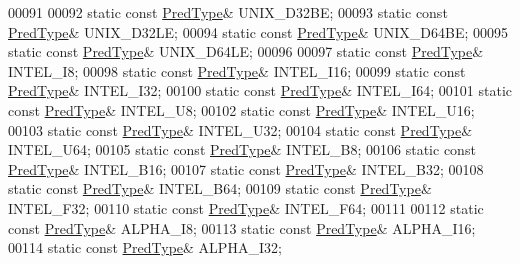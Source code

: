 \begin{DoxyCode}
00091 
00092         \textcolor{keyword}{static} \textcolor{keyword}{const} \hyperlink{class_h5_1_1_pred_type}{PredType}& UNIX\_D32BE;
00093         \textcolor{keyword}{static} \textcolor{keyword}{const} \hyperlink{class_h5_1_1_pred_type}{PredType}& UNIX\_D32LE;
00094         \textcolor{keyword}{static} \textcolor{keyword}{const} \hyperlink{class_h5_1_1_pred_type}{PredType}& UNIX\_D64BE;
00095         \textcolor{keyword}{static} \textcolor{keyword}{const} \hyperlink{class_h5_1_1_pred_type}{PredType}& UNIX\_D64LE;
00096 
00097         \textcolor{keyword}{static} \textcolor{keyword}{const} \hyperlink{class_h5_1_1_pred_type}{PredType}& INTEL\_I8;
00098         \textcolor{keyword}{static} \textcolor{keyword}{const} \hyperlink{class_h5_1_1_pred_type}{PredType}& INTEL\_I16;
00099         \textcolor{keyword}{static} \textcolor{keyword}{const} \hyperlink{class_h5_1_1_pred_type}{PredType}& INTEL\_I32;
00100         \textcolor{keyword}{static} \textcolor{keyword}{const} \hyperlink{class_h5_1_1_pred_type}{PredType}& INTEL\_I64;
00101         \textcolor{keyword}{static} \textcolor{keyword}{const} \hyperlink{class_h5_1_1_pred_type}{PredType}& INTEL\_U8;
00102         \textcolor{keyword}{static} \textcolor{keyword}{const} \hyperlink{class_h5_1_1_pred_type}{PredType}& INTEL\_U16;
00103         \textcolor{keyword}{static} \textcolor{keyword}{const} \hyperlink{class_h5_1_1_pred_type}{PredType}& INTEL\_U32;
00104         \textcolor{keyword}{static} \textcolor{keyword}{const} \hyperlink{class_h5_1_1_pred_type}{PredType}& INTEL\_U64;
00105         \textcolor{keyword}{static} \textcolor{keyword}{const} \hyperlink{class_h5_1_1_pred_type}{PredType}& INTEL\_B8;
00106         \textcolor{keyword}{static} \textcolor{keyword}{const} \hyperlink{class_h5_1_1_pred_type}{PredType}& INTEL\_B16;
00107         \textcolor{keyword}{static} \textcolor{keyword}{const} \hyperlink{class_h5_1_1_pred_type}{PredType}& INTEL\_B32;
00108         \textcolor{keyword}{static} \textcolor{keyword}{const} \hyperlink{class_h5_1_1_pred_type}{PredType}& INTEL\_B64;
00109         \textcolor{keyword}{static} \textcolor{keyword}{const} \hyperlink{class_h5_1_1_pred_type}{PredType}& INTEL\_F32;
00110         \textcolor{keyword}{static} \textcolor{keyword}{const} \hyperlink{class_h5_1_1_pred_type}{PredType}& INTEL\_F64;
00111 
00112         \textcolor{keyword}{static} \textcolor{keyword}{const} \hyperlink{class_h5_1_1_pred_type}{PredType}& ALPHA\_I8;
00113         \textcolor{keyword}{static} \textcolor{keyword}{const} \hyperlink{class_h5_1_1_pred_type}{PredType}& ALPHA\_I16;
00114         \textcolor{keyword}{static} \textcolor{keyword}{const} \hyperlink{class_h5_1_1_pred_type}{PredType}& ALPHA\_I32;

\end{DoxyCode}

